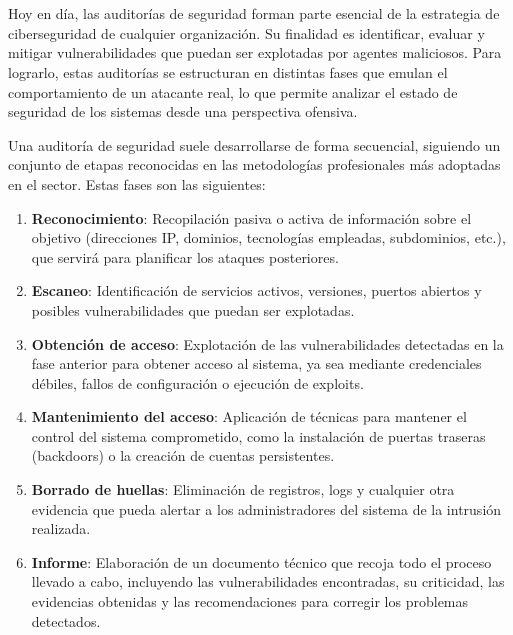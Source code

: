 \chapter{\introductionname}
\newpage
\begin{parskipenv}
Hoy en día, las auditorías de seguridad forman parte esencial de la estrategia de ciberseguridad de cualquier organización. Su finalidad es identificar, evaluar y mitigar vulnerabilidades que puedan ser explotadas por agentes maliciosos. Para lograrlo, estas auditorías se estructuran en distintas fases que emulan el comportamiento de un atacante real, lo que permite analizar el estado de seguridad de los sistemas desde una perspectiva ofensiva.

Una auditoría de seguridad suele desarrollarse de forma secuencial, siguiendo un conjunto de etapas reconocidas en las metodologías profesionales más adoptadas en el sector. Estas fases \cite{fases_auditoria} son las siguientes:

\begin{enumerate}
  \item \textbf{Reconocimiento}: Recopilación pasiva o activa de información sobre el objetivo (direcciones IP, dominios, tecnologías empleadas, subdominios, etc.), que servirá para planificar los ataques posteriores.
  
  \item \textbf{Escaneo}: Identificación de servicios activos, versiones, puertos abiertos y posibles vulnerabilidades que puedan ser explotadas.
  
  \item \textbf{Obtención de acceso}: Explotación de las vulnerabilidades detectadas en la fase anterior para obtener acceso al sistema, ya sea mediante credenciales débiles, fallos de configuración o ejecución de exploits.
  
  \item \textbf{Mantenimiento del acceso}: Aplicación de técnicas para mantener el control del sistema comprometido, como la instalación de puertas traseras (backdoors) o la creación de cuentas persistentes.
  
  \item \textbf{Borrado de huellas}: Eliminación de registros, logs y cualquier otra evidencia que pueda alertar a los administradores del sistema de la intrusión realizada.
  
  \item \textbf{Informe}: Elaboración de un documento técnico que recoja todo el proceso llevado a cabo, incluyendo las vulnerabilidades encontradas, su criticidad, las evidencias obtenidas y las recomendaciones para corregir los problemas detectados.
\end{enumerate}


\end{parskipenv}
